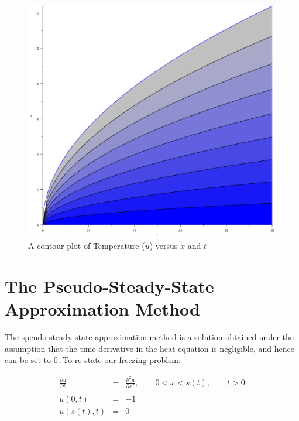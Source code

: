 \documentclass{report}
\begin{document}
\begin{figure}[h]
\centering
\includegraphics[scale = 0.15]{s-vs-t-contour}
\caption{A contour plot of Temperature ($u$) versus $x$ and $t$}
\label{fig:s-vs-t-contour}
\end{figure}










\section{The Pseudo-Steady-State Approximation Method}

The speudo-steady-state approximation method is a solution obtained under the assumption that the time 
derivative in the heat equation is negligible, and hence can be set to $0$. To re-state our freezing 
problem:\bigskip

\begin{eqnarray*} 
  \frac{\partial u}{\partial t} & = & \frac{\partial^2 u}{\partial x^2}, \qquad 0 < x < s(t), \qquad t > 0 \\\\
                        u(0, t) & = & -1 \\
                     u(s(t), t) & = & 0 
\end{eqnarray*}\medskip
\end{document}
